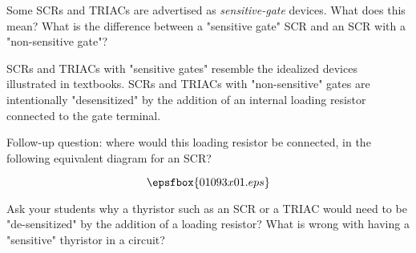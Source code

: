 

Some SCRs and TRIACs are advertised as {\it sensitive-gate} devices.  What does this mean?  What is the difference between a "sensitive gate" SCR and an SCR with a "non-sensitive gate"?







SCRs and TRIACs with "sensitive gates" resemble the idealized devices illustrated in textbooks.  SCRs and TRIACs with "non-sensitive" gates are intentionally "desensitized" by the addition of an internal loading resistor connected to the gate terminal.

\vskip 10pt

Follow-up question: where would this loading resistor be connected, in the following equivalent diagram for an SCR?

$$\epsfbox{01093x01.eps}$$







Ask your students why a thyristor such as an SCR or a TRIAC would need to be "de-sensitized" by the addition of a loading resistor?  What is wrong with having a "sensitive" thyristor in a circuit?




